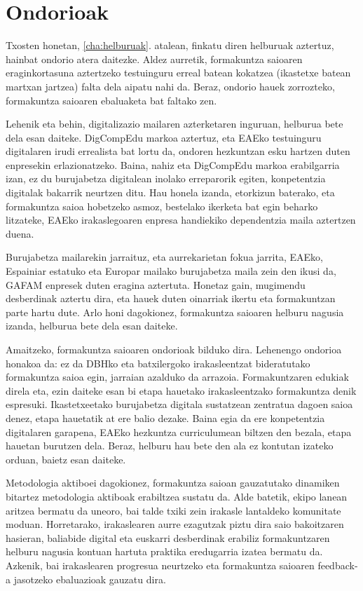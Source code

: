 \chapter{Ondorioak}\label{cha:ondorioak}

Txosten honetan, \ref{cha:helburuak}. atalean, finkatu diren helburuak aztertuz, hainbat ondorio atera daitezke. Aldez aurretik, formakuntza saioaren eraginkortasuna aztertzeko testuinguru erreal batean kokatzea (ikastetxe batean martxan jartzea) falta dela aipatu nahi da. Beraz, ondorio hauek zorrozteko, formakuntza saioaren ebaluaketa bat faltako zen.

Lehenik eta behin,  digitalizazio mailaren azterketaren inguruan,  helburua bete dela esan daiteke. DigCompEdu markoa aztertuz, eta EAEko testuinguru digitalaren irudi errealista bat lortu da, ondoren hezkuntzan esku hartzen duten enpresekin erlazionatzeko. Baina, nahiz eta DigCompEdu markoa erabilgarria izan, ez du burujabetza digitalean inolako erreparorik egiten, konpetentzia digitalak bakarrik neurtzen ditu. Hau honela izanda, etorkizun baterako, eta formakuntza saioa hobetzeko asmoz, bestelako ikerketa bat egin beharko litzateke, EAEko irakaslegoaren enpresa handiekiko dependentzia maila aztertzen duena.

Burujabetza mailarekin jarraituz, eta aurrekarietan fokua jarrita, EAEko, Espainiar estatuko eta  Europar mailako burujabetza maila zein den ikusi da, GAFAM enpresek duten eragina aztertuta. Honetaz gain, mugimendu desberdinak aztertu dira, eta hauek duten oinarriak ikertu eta formakuntzan parte hartu dute. Arlo honi dagokionez, formakuntza saioaren helburu nagusia izanda, helburua bete dela esan daiteke.

Amaitzeko, formakuntza saioaren ondorioak bilduko dira. Lehenengo ondorioa honakoa da: ez da DBHko eta batxilergoko irakasleentzat bideratutako formakuntza saioa egin, jarraian azalduko da arrazoia. Formakuntzaren edukiak direla eta,  ezin daiteke esan bi etapa hauetako irakasleentzako formakuntza denik espresuki. Ikastetxeetako burujabetza digitala sustatzean zentratua dagoen saioa denez, etapa hauetatik at ere balio dezake. Baina egia da ere konpetentzia digitalaren garapena, EAEko hezkuntza curriculumean biltzen den bezala, etapa hauetan burutzen dela. Beraz, helburu hau bete den ala ez kontutan izateko orduan, baietz esan daiteke.

Metodologia aktiboei dagokionez, formakuntza saioan gauzatutako dinamiken bitartez metodologia aktiboak erabiltzea sustatu da. Alde batetik, ekipo lanean aritzea bermatu da uneoro, bai talde txiki zein irakasle lantaldeko komunitate moduan. Horretarako, irakaslearen aurre ezagutzak piztu dira saio bakoitzaren hasieran, baliabide digital eta euskarri desberdinak erabiliz formakuntzaren helburu nagusia kontuan hartuta praktika eredugarria izatea bermatu da. Azkenik, bai irakaslearen progresua neurtzeko eta formakuntza saioaren feedback-a jasotzeko ebaluazioak gauzatu dira.

